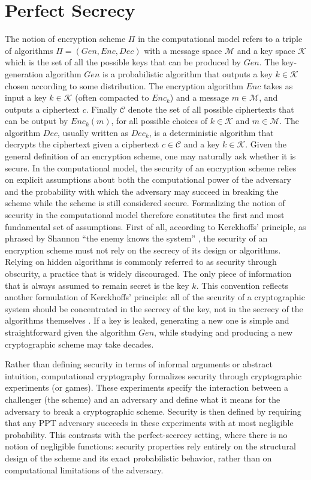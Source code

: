 \section{Perfect Secrecy}\label{sec:perfect-secrecy}
The notion of encryption scheme $\Pi$ in the computational model refers to a triple of algorithms $\Pi=(Gen, Enc, Dec)$ with a message space $\mathcal{M}$ and a key space $\mathcal{K}$ which is the set of all the possible keys that can be produced by $Gen$. The key-generation algorithm $Gen$ is a probabilistic algorithm that outputs a key $k \in \mathcal{K}$ chosen according to some distribution. The encryption algorithm $Enc$ takes as input a key $k \in \mathcal{K}$ (often compacted to $Enc_k$) and a message $m \in \mathcal{M}$, and outputs a ciphertext $c$. Finally $\mathcal{C}$ denote the set
of all possible ciphertexts that can be output by $Enc_k(m)$, for all possible
choices of $k \in \mathcal{K}$ and $m \in \mathcal{M}$. The algorithm $Dec$, usually written as $Dec_k$, is a deterministic algorithm that decrypts the ciphertext given a ciphertext $c  \in \mathcal{C}$ and a key $k \in \mathcal{K}$. Given the general definition of an encryption scheme, one may naturally ask whether it is secure. In the computational model, the security of an encryption scheme relies on explicit assumptions about both the computational power of the adversary and the probability with which the adversary may succeed in breaking the scheme while the scheme is still considered secure. Formalizing the notion of security in the computational model therefore constitutes the first and most fundamental set of assumptions. First of all, according to Kerckhoffs' principle, as phrased by Shannon \enquote{the enemy knows the system} \cite{shannon-communication-theory-of-secrecy-systems}, the security of an encryption scheme must not rely on the secrecy of its design or algorithms. Relying on hidden algorithms is commonly referred to as security through obscurity, a practice that is widely discouraged. The only piece of information that is always assumed to remain secret is the key $k$. This convention reflects another formulation of Kerckhoffs' principle: all of the security of a cryptographic system should be concentrated in the secrecy of the key, not in the secrecy of the algorithms themselves \cite{joyofcryptography}. If a key is leaked, generating a new one is simple and straightforward given the algorithm $Gen$, while studying and producing a new cryptographic scheme may take decades. 

Rather than defining security in terms of informal arguments or abstract intuition, computational cryptography formalizes security through cryptographic experiments (or games). These experiments specify the interaction between a challenger (the scheme) and an adversary and define what it means for the adversary to break a cryptographic scheme. Security is then defined by requiring that any PPT adversary succeeds in these experiments with at most negligible probability. This contrasts with the perfect-secrecy setting, where there is no notion of negligible functions: security properties rely entirely on the structural design of the scheme and its exact probabilistic behavior, rather than on computational limitations of the adversary.

